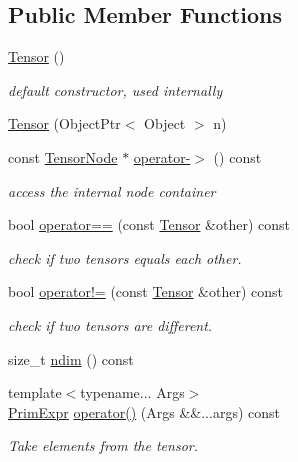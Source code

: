 \subsection*{Public Member Functions}
\begin{DoxyCompactItemize}
\item 
\hyperlink{classtvm_1_1te_1_1Tensor_a23a2f5549bdcd66eb210fd71813d6051}{Tensor} ()
\begin{DoxyCompactList}\small\item\em default constructor, used internally \end{DoxyCompactList}\item 
\hyperlink{classtvm_1_1te_1_1Tensor_a6d619c9a463a0ad05bb5bc27189d1230}{Tensor} (Object\+Ptr$<$ Object $>$ n)
\item 
const \hyperlink{classtvm_1_1te_1_1TensorNode}{Tensor\+Node} $\ast$ \hyperlink{classtvm_1_1te_1_1Tensor_a725bede99576a444220c7c46473edbba}{operator-\/$>$} () const 
\begin{DoxyCompactList}\small\item\em access the internal node container \end{DoxyCompactList}\item 
bool \hyperlink{classtvm_1_1te_1_1Tensor_a15b163083896422fbbf6a1ad972b461e}{operator==} (const \hyperlink{classtvm_1_1te_1_1Tensor}{Tensor} \&other) const 
\begin{DoxyCompactList}\small\item\em check if two tensors equals each other. \end{DoxyCompactList}\item 
bool \hyperlink{classtvm_1_1te_1_1Tensor_aa9247465fac8685c9b816359c144a32d}{operator!=} (const \hyperlink{classtvm_1_1te_1_1Tensor}{Tensor} \&other) const 
\begin{DoxyCompactList}\small\item\em check if two tensors are different. \end{DoxyCompactList}\item 
size\+\_\+t \hyperlink{classtvm_1_1te_1_1Tensor_abe7e5dcf5965fa514ba2a78b2f71a871}{ndim} () const 
\item 
{\footnotesize template$<$typename... Args$>$ }\\\hyperlink{classtvm_1_1PrimExpr}{Prim\+Expr} \hyperlink{classtvm_1_1te_1_1Tensor_a2c58dbdca81f9326dc097d2dfa932c13}{operator()} (Args \&\&...args) const 
\begin{DoxyCompactList}\small\item\em Take elements from the tensor. \end{DoxyCompactList}\item 

\end{DoxyCompactItemize}
